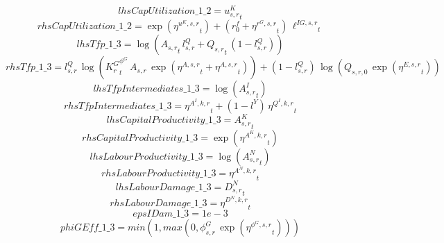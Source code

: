 \begin{dmath*}
lhsCapUtilization\_1\_2 = {{u^K_{s,r}}}_{t}
\end{dmath*}
\begin{dmath*}
rhsCapUtilization\_1\_2 = \exp\left({{\eta^{u^K,s,r}}}_{t}\right)+\left({{r^f_0}}+{{\eta^{r^G,s,r}}}_{t}\right)\, {{\ell^{IG,s,r}}}_{t}
\end{dmath*}
\begin{dmath*}
lhsTfp\_1\_3 = \log\left({{A_{s,r}}}_{t}\, {{l^{Q}_{s,r}}}+{{Q_{s,r}}}_{t}\, \left(1-{{l^{Q}_{s,r}}}\right)\right)
\end{dmath*}
\begin{dmath*}
rhsTfp\_1\_3 = {{l^{Q}_{s,r}}}\, \log\left({{K^G_{r}}}_{t}^{{{\phi^{G}}}}\, {{A_{s,r}}}\, \exp\left({{\eta^{A,s,r}}}_{t}+{{\eta^{A,s,r}}}_{t}\right)\right)+\left(1-{{l^{Q}_{s,r}}}\right)\, \log\left({{Q_{s,r,0}}}\, \exp\left({{\eta^{E,s,r}}}_{t}\right)\right)
\end{dmath*}
\begin{dmath*}
lhsTfpIntermediates\_1\_3 = \log\left({{A^{I}_{s,r}}}_{t}\right)
\end{dmath*}
\begin{dmath*}
rhsTfpIntermediates\_1\_3 = {{\eta^{A^{I},k,r}}}_{t}+\left(1-{{l^{Y}}}\right)\, {{\eta^{Q^{I},k,r}}}_{t}
\end{dmath*}
\begin{dmath*}
lhsCapitalProductivity\_1\_3 = {{A^{K}_{s,r}}}_{t}
\end{dmath*}
\begin{dmath*}
rhsCapitalProductivity\_1\_3 = \exp\left({{\eta^{A^{K},k,r}}}_{t}\right)
\end{dmath*}
\begin{dmath*}
lhsLabourProductivity\_1\_3 = \log\left({{A^{N}_{s,r}}}_{t}\right)
\end{dmath*}
\begin{dmath*}
rhsLabourProductivity\_1\_3 = {{\eta^{A^{N},k,r}}}_{t}
\end{dmath*}
\begin{dmath*}
lhsLabourDamage\_1\_3 = {{D^N_{s,r}}}_{t}
\end{dmath*}
\begin{dmath*}
rhsLabourDamage\_1\_3 = {{\eta^{D^{N},k,r}}}_{t}
\end{dmath*}
\begin{dmath*}
epsIDam\_1\_3 = 1e-3
\end{dmath*}
\begin{dmath*}
phiGEff\_1\_3 = min(1,max(0,{{\phi^{G}_{s,r}}}\, \exp\left({{\eta^{\phi^{G},s,r}}}_{t}\right)))
\end{dmath*}
